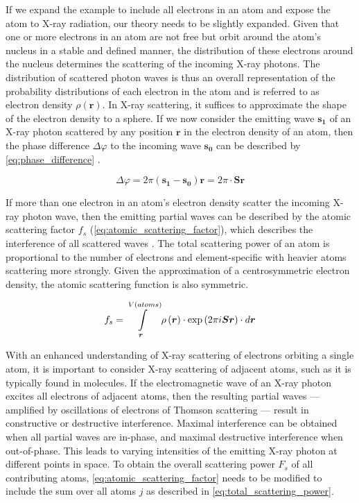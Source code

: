 If we expand the example to include all electrons in an atom and expose the atom to X-ray radiation, our theory needs to be slightly expanded. Given that one or more electrons in an atom are not free but orbit around the atom's nucleus in a stable and defined manner, the distribution of these electrons around the nucleus determines the scattering of the incoming X-ray photons. The distribution of scattered photon waves is thus an overall representation of the probability distributions of each electron in the atom and is referred to as electron density $\rho(\boldsymbol{r})$. In X-ray scattering, it suffices to approximate the shape of the electron density to a sphere. If we now consider the emitting wave $\boldsymbol{s_1}$ of an X-ray photon scattered by any position $\boldsymbol{r}$ in the electron density of an atom, then the phase difference $\Delta\varphi$ to the incoming wave $\boldsymbol{s_0}$ can be described by \cref{eq:phase_difference} \cite{Rupp2010-nc}.

\begin{equation}
    \Delta\varphi=2\pi\left(\boldsymbol{s_1}-\boldsymbol{s_0}\right)\boldsymbol{r}=2\pi \cdot \boldsymbol{S}\boldsymbol{r}
    \label{eq:phase_difference}
\end{equation}

If more than one electron in an atom's electron density scatter the incoming X-ray photon wave, then the emitting partial waves can be described by the atomic scattering factor $f_s$ (\cref{eq:atomic_scattering_factor}), which describes the interference of all scattered waves \cite{Rupp2010-nc}. The total scattering power of an atom is proportional to the number of electrons and element-specific with heavier atoms scattering more strongly. Given the approximation of a centrosymmetric electron density, the atomic scattering function is also symmetric.

\begin{equation}
    f_s=\int\limits_{\boldsymbol{r}}^{V(atoms)}\rho\left(\boldsymbol{r}\right) \cdot \exp\left(2\pi\\i\boldsymbol{S}\boldsymbol{r}\right) \cdot d\boldsymbol{r}
    \label{eq:atomic_scattering_factor}
\end{equation}

With an enhanced understanding of X-ray scattering of electrons orbiting a single atom, it is important to consider X-ray scattering of adjacent atoms, such as it is typically found in molecules. If the electromagnetic wave of an X-ray photon excites all electrons of adjacent atoms, then the resulting partial waves --- amplified by oscillations of electrons of Thomson scattering --- result in constructive or destructive interference. Maximal interference can be obtained when all partial waves are in-phase, and maximal destructive interference when out-of-phase. This leads to varying intensities of the emitting X-ray photon at different points in space. To obtain the overall scattering power $F_s$ of all contributing atoms, \cref{eq:atomic_scattering_factor} needs to be modified to include the sum over all atoms $j$ as described in \cref{eq:total_scattering_power}.

